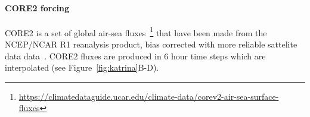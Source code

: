 \paragraph{CORE2 forcing}
CORE2 is a set of global air-sea fluxes~\cite{griffies2012datasets,large2009global,
 hurrell2008new}\footnote{\url{https://climatedataguide.ucar.edu/climate-data/corev2-air-sea-surface-fluxes}}
 that have been made from the NCEP/NCAR R1 reanalysis product,
 bias corrected with more reliable sattelite data data~\cite{core2, core2expert}.
 CORE2 fluxes  are produced in 6 hour time steps which are interpolated
 (see Figure~\ref{fig:katrina}B-D).


